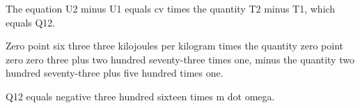 The equation U2 minus U1 equals cv times the quantity T2 minus T1, which equals Q12. 

Zero point six three three kilojoules per kilogram times the quantity zero point zero zero three plus two hundred seventy-three times one, minus the quantity two hundred seventy-three plus five hundred times one.

Q12 equals negative three hundred sixteen times m dot omega.